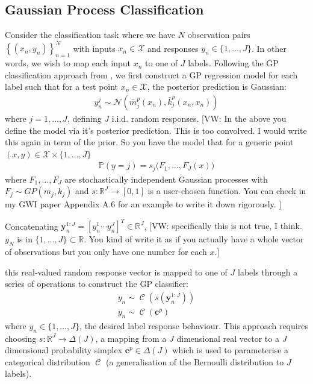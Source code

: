 \documentclass{article}
\newcommand{\vw}[1]{{\color{green} [VW: #1]}}
\newcommand{\calX}{\mathcal{X}}
\newcommand{\Cat}{\operatorname{\mathcal{C}}}
\numberwithin{equation}{section}
\begin{document}
\subsection{Gaussian Process Classification}\label{section:gp-classifiers}
Consider the classification task where we have $N$ observation pairs $\left\{(x_n, y_n)\right\}_{n=1}^{N}$ with inputs $x_n \in \mathcal{X}$ and responses $y_n \in \{1, \dots, J\}$. In other words, we wish to map each input $x_n$ to one of $J$ labels. Following the GP classification approach from \cite{matthews2017scalable}, we first construct a GP regression model for each label such that for a test point $x_n \in \mathcal{X}$, the posterior prediction is Gaussian:
\begin{align}
    y_n^j \sim \mathcal{N}\left(\bar{m}^p_j(x_n), \bar{k}^p_j(x_n, x_n)\right)
    \label{gp-classifier-regressors}
\end{align}
where $j=1, \dots, J$, defining $J$ i.i.d. random responses. \vw{In the above you define the model via it's posterior prediction. This is too convolved. I would write this again in term of the prior. So you have the model that for a generic point $(x,y) \in \calX \times \{1,\hdots, J\}$
\begin{align}
    \mathbb{P}( y = j ) = s_j\big( F_1, \hdots, F_J(x) \big)
\end{align}
where $F_1,\hdots, F_J$ are stochastically independent Gaussian processes with $F_j \sim GP(m_j,k_j)$ and $s:\mathbb{R}^J \to [0,1]$ is a user-chosen function. You can check in my GWI paper Appendix A.6 for an example to write it down rigorously.
}

Concatenating $\mathbf{y}_n^{1:J} = [y_n^1 \cdots y_n^J]^T \in \mathbb{R}^{J}$, \vw{specifically this is not true, I think. $y_N$ is in $\{1, \hdots, J \} \subset \mathbb{R}$. You kind of write it as if you actually have a whole vector of observations but you only have one number for each $x$.}

this real-valued random response vector is mapped to one of $J$ labels through a series of operations to construct the GP classifier:
\begin{align}
y_n \sim \Cat \left(s\left(\mathbf{y}_n^{1:J}\right)\right) \\
y_n \sim \Cat \left(\mathbf{c}^p\right)
\end{align}
where $y_n \in \{1, \dots, J\}$, the desired label response behaviour. This approach requires choosing $s: \mathbb{R}^J \rightarrow \Delta(J)$, a mapping from a $J$ dimensional real vector to a $J$ dimensional probability simplex $\mathbf{c}^p \in \Delta(J)$ which is used to parameterise a categorical distribution $\Cat$ (a generalisation of the Bernoulli distribution to $J$ labels).
\end{document}
